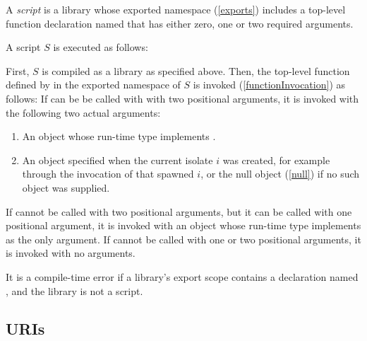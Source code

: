 \documentclass{article}
\begin{document}
\LMHash{}
A {\em script} is a library whose exported namespace (\ref{exports}) includes
a top-level function declaration named 
that has either zero, one or two required arguments.

A script $S$ is executed as follows:

\LMHash{}
First, $S$ is compiled as a library as specified above.
Then, the top-level function defined by 
in the exported namespace of $S$ is invoked (\ref{functionInvocation})
as follows:
If  can be be called with with two positional arguments,
it is invoked with the following two actual arguments:
\begin{enumerate}
\item An object whose run-time type implements .
\item An object specified when the current isolate $i$ was created,
for example through the invocation of  that spawned $i$,
or the null object (\ref{null}) if no such object was supplied.
\end{enumerate}
If  cannot be called with two positional arguments,
but it can be called with one positional argument,
it is invoked with an object whose run-time type implements 
as the only argument.
If  cannot be called with one or two positional arguments,
it is invoked with no arguments.



\LMHash{}
It is a compile-time error if a library's export scope contains a declaration
named , and the library is not a script.


\subsection{URIs}
\end{document}
